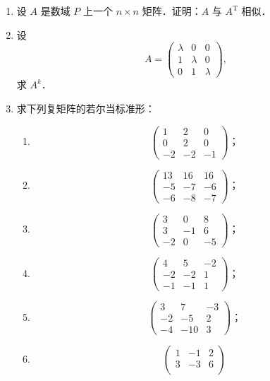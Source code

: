 \begin{enumerate}
  \ansproof
  \item 设 $A$ 是数域 $P$ 上一个 $n\times n$ 矩阵．证明：$A$ 与 $A^{\mathrm{T}}$ 相似．

  \ansproof
  \item 设
  \[
  A=\begin{pmatrix}
    \lambda & 0 & 0 \\
    1 & \lambda & 0 \\
    0 & 1 & \lambda
  \end{pmatrix},
  \]
  求 $A^k$．

  \anscompute
  \item 求下列复矩阵的若尔当标准形：
  \begin{enumerate}
    \item \[
    \begin{pmatrix}
      1 & 2 & 0 \\
      0 & 2 & 0 \\
      -2 & -2 & -1
    \end{pmatrix}\text{；}
    \]
  \anssub
    \item \[
    \begin{pmatrix}
      13 & 16 & 16 \\
      -5 & -7 & -6 \\
      -6 & -8 & -7
    \end{pmatrix}\text{；}
    \]
  \anssub
    \item \[
    \begin{pmatrix}
      3 & 0 & 8 \\
      3 & -1 & 6 \\
      -2 & 0 & -5
    \end{pmatrix}\text{；}
    \]
  \anssub
    \item \[
    \begin{pmatrix}
      4 & 5 & -2 \\
      -2 & -2 & 1 \\
      -1 & -1 & 1
    \end{pmatrix}\text{；}
    \]
  \anssub
    \item \[
    \begin{pmatrix}
      3 & 7 & -3 \\
      -2 & -5 & 2 \\
      -4 & -10 & 3
    \end{pmatrix}\text{；}
    \]
  \anssub
    \item \[
    \begin{pmatrix}
      1 & -1 & 2 \\
      3 & -3 & 6 \\

\end{pmatrix}\]
\end{enumerate}
\end{enumerate}
